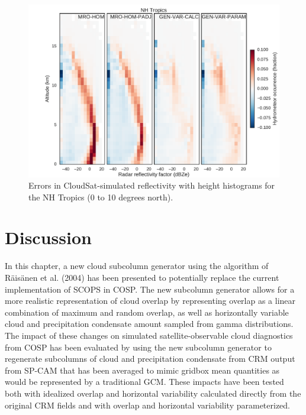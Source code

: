 \begin{figure}[htbp]
\centering
\includegraphics{graphics/subgrid2_cfadDbze94_NHTropics_all_diff.pdf}
\caption{\label{fig:subgrid2_cfadDbze94_NHTropics_all_diff}Errors in
CloudSat-simulated reflectivity with height histograms for the NH
Tropics (0 to 10 degrees
north).}\label{fig:subgrid2ux5fcfadDbze94ux5fNHTropicsux5fallux5fdiff}
\end{figure}

\section{Discussion}\label{sec:subgrid2ux5fdiscussion}

In this chapter, a new cloud subcolumn generator using the algorithm of
Räisänen et al. (2004) has been presented to potentially replace the
current implementation of SCOPS in COSP. The new subcolumn generator
allows for a more realistic representation of cloud overlap by
representing overlap as a linear combination of maximum and random
overlap, as well as horizontally variable cloud and precipitation
condensate amount sampled from gamma distributions. The impact of these
changes on simulated satellite-observable cloud diagnostics from COSP
has been evaluated by using the new subcolumn generator to regenerate
subcolumns of cloud and precipitation condensate from CRM output from
SP-CAM that has been averaged to mimic gridbox mean quantities as would
be represented by a traditional GCM. These impacts have been tested both
with idealized overlap and horizontal variability calculated directly
from the original CRM fields and with overlap and horizontal variability
parameterized.

